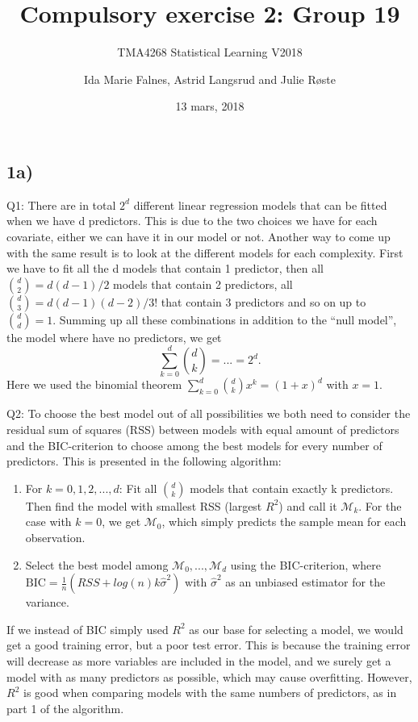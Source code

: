 \documentclass[]{article}
\title{Compulsory exercise 2: Group 19}
\subtitle{TMA4268 Statistical Learning V2018}
\author{Ida Marie Falnes, Astrid Langsrud and Julie Røste}
\date{13 mars, 2018}
\begin{document}
\maketitle

\subsection{1a)}\label{a}

Q1: There are in total \(2^d\) different linear regression models that
can be fitted when we have d predictors. This is due to the two choices
we have for each covariate, either we can have it in our model or not.
Another way to come up with the same result is to look at the different
models for each complexity. First we have to fit all the d models that
contain 1 predictor, then all \(\binom{d}{2}=d(d-1)/2\) models that
contain 2 predictors, all \(\binom{d}{3}=d(d-1)(d-2)/3!\) that contain 3
predictors and so on up to \(\binom{d}{d}=1\). Summing up all these
combinations in addition to the ``null model'', the model where have no
predictors, we get \[\sum_{k=0}^{d} \binom{d}{k} = ... = 2^d.\] Here we
used the binomial theorem \(\sum_{k=0}^{d}\binom{d}{k}x^k=(1+x)^d\) with
\(x=1\).

Q2: To choose the best model out of all possibilities we both need to
consider the residual sum of squares (RSS) between models with equal
amount of predictors and the BIC-criterion to choose among the best
models for every number of predictors. This is presented in the
following algorithm:

\begin{enumerate}
\def\labelenumi{\arabic{enumi}.}
\item
  For \(k=0,1,2,...,d\): \newline
  Fit all \(\binom{d}{k}\) models that contain exactly k predictors.
  Then find the model with smallest RSS (largest \(R^2\)) and call it
  \(\mathcal{M}_k\). For the case with \(k=0\), we get
  \(\mathcal{M}_0\), which simply predicts the sample mean for each
  observation.
\item
  Select the best model among \(\mathcal{M}_0, ...,\mathcal{M}_d\) using
  the BIC-criterion, where
  \(\text{BIC}=\frac{1}{n}(RSS+log(n)k{\hat\sigma}^2)\) with
  \({\hat\sigma}^2\) as an unbiased estimator for the variance.
\end{enumerate}

If we instead of BIC simply used \(R^2\) as our base for selecting a
model, we would get a good training error, but a poor test error. This
is because the training error will decrease as more variables are
included in the model, and we surely get a model with as many predictors
as possible, which may cause overfitting. However, \(R^2\) is good when
comparing models with the same numbers of predictors, as in part 1 of
the algorithm.
\end{document}

